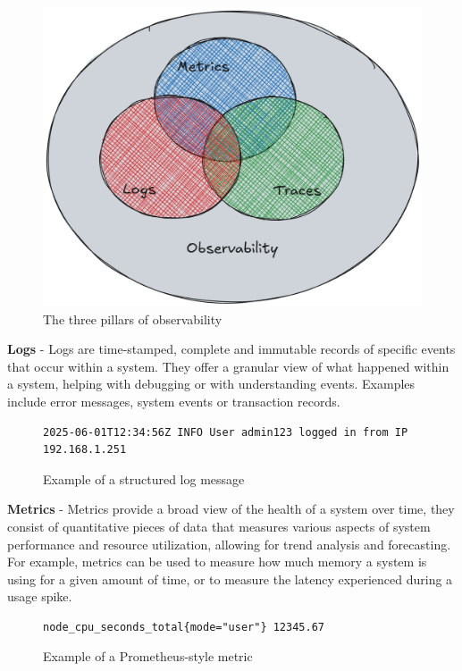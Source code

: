 \begin{figure}[H]
    \centering
    \includegraphics[width=\linewidth, keepaspectratio]{./figures/observability_pillars}
    \caption{The three pillars of observability}
\end{figure}


\textbf{Logs} - Logs are time-stamped, complete and immutable records of specific events that occur within a system.
They offer a granular view of what happened within a system, helping with debugging or with understanding
events.
Examples include error messages, system events or transaction records.\\

\begin{figure}[h]
    \centering
    \begin{lstlisting}
2025-06-01T12:34:56Z INFO User admin123 logged in from IP 192.168.1.251
    \end{lstlisting}
    \caption{Example of a structured log message}
\end{figure}


\textbf{Metrics} - Metrics provide a broad view of the health of a system over time, they consist of quantitative
pieces
of data that
measures various aspects of system performance and resource utilization, allowing for trend analysis and forecasting.
For example, metrics can be used to measure how much memory a system is using for a given amount of time, or to
measure the latency experienced during a usage spike.\\
\begin{figure}[h]
    \centering
    \begin{lstlisting}
node_cpu_seconds_total{mode="user"} 12345.67
    \end{lstlisting}
    \caption{Example of a Prometheus-style metric}
\end{figure}


